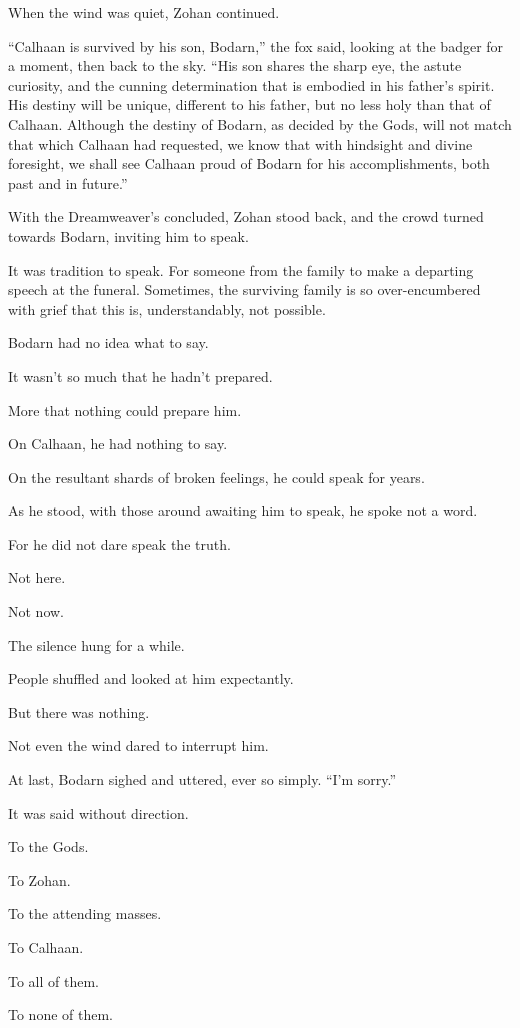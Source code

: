When the wind was quiet, Zohan continued.

``Calhaan is survived by his son, Bodarn,'' the fox said, looking at the badger for a moment, then back to the sky. ``His son shares the sharp eye, the astute curiosity, and the cunning determination that is embodied in his father's spirit. His destiny will be unique, different to his father, but no less holy than that of Calhaan. Although the destiny of Bodarn, as decided by the Gods, will not match that which Calhaan had requested, we know that with hindsight and divine foresight, we shall see Calhaan proud of Bodarn for his accomplishments, both past and in future.''

With the Dreamweaver's concluded, Zohan stood back, and the crowd turned towards Bodarn, inviting him to speak.

It was tradition to speak. For someone from the family to make a departing speech at the funeral. Sometimes, the surviving family is so over-encumbered with grief that this is, understandably, not possible.

Bodarn had no idea what to say.

It wasn't so much that he hadn't prepared.

More that nothing could prepare him.

On Calhaan, he had nothing to say.

On the resultant shards of broken feelings, he could speak for years.

As he stood, with those around awaiting him to speak, he spoke not a word.

For he did not dare speak the truth.

Not here.

Not now.

The silence hung for a while.

People shuffled and looked at him expectantly.

But there was nothing.

Not even the wind dared to interrupt him.

At last, Bodarn sighed and uttered, ever so simply. ``I'm sorry.''

It was said without direction.

To the Gods.

To Zohan.

To the attending masses.

To Calhaan.

To all of them.

To none of them.

